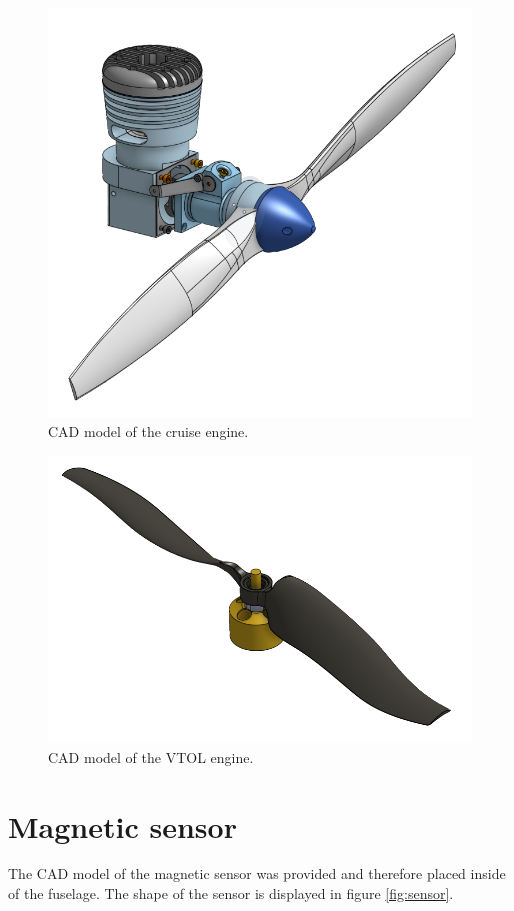 \documentclass[english,fira]{ist-report}
\begin{document}
\begin{figure}[ht]
	\centering
	\includegraphics[width = 0.8\linewidth]{graphics/cad/engineCruise.png}
	\caption{CAD model of the cruise engine.}
	\label{fig:engineCruise}
\end{figure}

\begin{figure}[ht]
	\centering
	\includegraphics[width = 0.8\linewidth]{graphics/cad/engineVtol.png}
	\caption{CAD model of the VTOL engine.}
	\label{fig:engineVtol}
\end{figure}

\section{Magnetic sensor}

The CAD model of the magnetic sensor was provided and therefore placed inside of the fuselage. The shape of the sensor is displayed in figure \ref{fig:sensor}.
\end{document}
